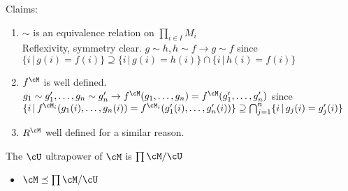 \noindent
Claims: 
\begin{enumerate}
    \item $\sim$ is an equivalence relation on $\prod_{i \in I}M_i$ \\
    Reflexivity, symmetry clear. $g \sim h, h \sim f \to g \sim f$ since $\{ i \, | \, g(i)=f(i)\}\supseteq \{ i \, | \, g(i)=h(i)\} \cap \{i \, | \, h(i) = f(i)\}$ 
    \item $f^\cM$ is well defined. \\
    $g_1 \sim g_1', \ldots, g_n \sim g_n' \to f^{\cM}(g_1, \ldots, g_n) = f^{\cM}(g_1', \ldots, g_n')$ since $\{ i \, | \, f^{\cM_i}(g_1(i), \ldots, g_n(i)) = f^{\cM_i}(g_1'(i), \ldots, g_n'(i))\} \supseteq \bigcap_{j=1}^n\{ i \, | \, g_j(i) = g_j'(i)\}$ 
    \item $R^{\cM}$ well defined for a similar reason. 
\end{enumerate}

\begin{definition}
    The $\cU$ ultrapower of $\cM$ is $\prod \cM / \cU$ 
\end{definition}

\begin{itemize}
    \item $\cM \preceq \prod \cM /\cU$ 
\end{itemize}